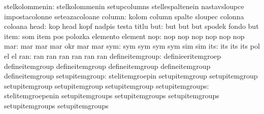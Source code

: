                   stelkolommenin: stelkolommenin                   setupcolumns
                                  stellespaltenein                 nastavsloupce
                                  impostacolonne                   seteazacoloane
                          column: kolom                            column
                                  spalte                           sloupec
                                  colonna                          coloana
                            head: kop                              head
                                  kopf                             nadpis
                                  testa                            titlu %
                             but: but                              but
                                  but                              spodek
                                  fondo                            but
                            item: som                              item
                                  pos                              polozka
                                  elemento                         element
                             nop: nop                              nop
                                  nop                              nop
                                  nop                              nop
                             mar: mar                              mar
                                  mar                              okr
                                  mar                              mar
                             sym: sym                              sym
                                  sym                              sym
                                  sim                              sim
                             its: its                              its
                                  its                              pol %
                                  el                               el  %
                             ran: ran                              ran
                                  ran                              ran
                                  ran                              ran
                 defineitemgroup: definieeritemgroep               defineitemgroup  
                                  defineitemgroup                  defineitemgroup  
                                  defineitemgroup                  defineitemgroup                   
                  setupitemgroup: stelitemgroepin                  setupitemgroup
                                  setupitemgroup                   setupitemgroup
                                  setupitemgroup                   setupitemgroup
                 setupitemgroups: stelitemgroepenin                setupitemgroups
                                  setupitemgroups                  setupitemgroups
                                  setupitemgroups                  setupitemgroups

